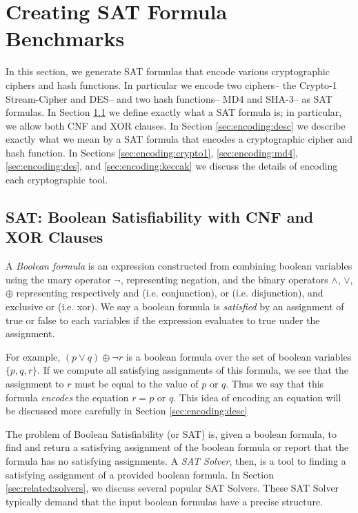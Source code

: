 \section{Creating SAT Formula Benchmarks}
\label{sec:encoding}

In this section, we generate SAT formulas that encode various cryptographic ciphers and hash functions. In particular we encode two ciphers-- the Crypto-1 Stream-Cipher and DES-- and two hash functions-- MD4 and SHA-3-- as SAT formulas. In Section \ref{sec:encoding:sat} we define exactly what a SAT formula is; in particular, we allow both CNF and XOR clauses. In Section \ref{sec:encoding:desc} we describe exactly what we mean by a SAT formula that encodes a cryptographic cipher and hash function. In Sections \ref{sec:encoding:crypto1}, \ref{sec:encoding:md4}, \ref{sec:encoding:des}, and \ref{sec:encoding:keccak} we discuss the details of encoding each cryptographic tool.

\subsection{SAT: Boolean Satisfiability with CNF and XOR Clauses}
\label{sec:encoding:sat}

A \emph{Boolean formula} is an expression constructed from combining boolean variables using the unary operator $\neg$, representing negation, and the binary operators $\land$, $\lor$, $\oplus$ representing respectively and (i.e. conjunction), or (i.e. disjunction), and exclusive or (i.e. xor). We say a boolean formula is \emph{satisfied} by an assignment of true or false to each variables if the expression evaluates to true under the assignment.

For example, $(p \lor q) \oplus \neg r$ is a boolean formula over the set of boolean variables $\{p, q, r\}$. If we compute all satisfying assignments of this formula, we see that the assignment to $r$ must be equal to the value of $p \text{ or } q$. Thus we say that this formula \emph{encodes} the equation $r = p \text{ or } q$. This idea of encoding an equation will be discussed more carefully in Section \ref{sec:encoding:desc}

The problem of Boolean Satisfiability (or SAT) is, given a boolean formula, to find and return a satisfying assignment of the boolean formula or report that the formula has no satisfying assignments. A \emph{SAT Solver}, then, is a tool to finding a satisfying assignment of a provided boolean formula. In Section \ref{sec:related:solvers}, we discuss several popular SAT Solvers. These SAT Solver typically demand that the input boolean formulas have a precise structure. 

